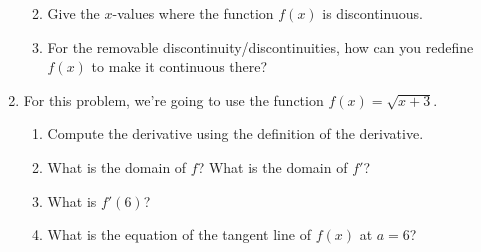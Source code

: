 \documentclass[12pt]{article}
\begin{document}
\begin{enumerate}
\begin{enumerate}

\item Give the $x$-values where the function $f(x)$ is discontinuous.
\vfill
\item For the removable discontinuity/discontinuities, how can you redefine $f(x)$ to make it continuous there?
\vfill
\end{enumerate}
\pagebreak

\item For this problem, we're going to use the function $f(x) = \sqrt{x+3}$.
\begin{enumerate}
\item Compute the derivative using the definition of the derivative.
\vspace{4in}

\item What is the domain of $f$? What is the domain of $f'$?
\vspace{1in}
\item What is $f'(6)$?
\vspace{0.5in}

\item What is the equation of the tangent line of $f(x)$ at $a=6$?
\end{enumerate}
\end{enumerate}
\end{document}
